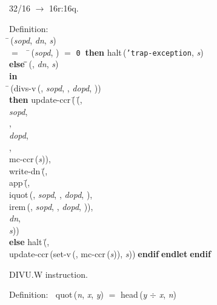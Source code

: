  32/16 $\rightarrow$ 16r:16q.
\begin{tabbing}{\sc Definition}: \\  
\=\,({\it{sopd\/}}, {\it{dn\/}}, {\it{s\/}}) \\ 
$=$$\;\;\;\;$\=\,({\it{sopd\/}}, {}) $=$ {\tt{0}}$\;\;${\bf then }{\rm{halt}}\,({\tt{'}}{\tt{trap-exception}}, {\it{s\/}}) \\ 
{\bf else }\=\=\,({}, {\it{dn\/}}, {\it{s\/}})\- \\ 
{\bf in} \\ 
\=\,({\rm{divs-v}}\,({}, {\it{sopd\/}}, {}, {\it{dopd\/}}, {})) \\ 
{\bf then }{\rm{update-ccr}}\,(\=\,(\=, \\ 
{\it{sopd\/}}, \\ 
{}, \\ 
{\it{dopd\/}}, \\ 
{}, \\ 
{\rm{mc-ccr}}\,({\it{s\/}}))\-, \\ 
{\rm{write-dn}}\,(\=, \\ 
{\rm{app}}\,(\=, \\ 
{\rm{iquot}}\,({}, {\it{sopd\/}}, {}, {\it{dopd\/}}, {}), \\ 
{\rm{irem}}\,({}, {\it{sopd\/}}, {}, {\it{dopd\/}}, {}))\-, \\ 
{\it{dn\/}}, \\ 
{\it{s\/}})\-)\- \\ 
{\bf else }{\rm{halt}}\,(\=, \\ 
{\rm{update-ccr}}\,({\rm{set-v}}\,({}, {\rm{mc-ccr}}\,({\it{s\/}})), {\it{s\/}}))\-$\;${\bf  endif}\-$\;${\bf  endlet}\-$\;${\bf  endif}\-\-
\end{tabbing}

 DIVU.W instruction.
\begin{tabbing}{\sc Definition}:$\;\;$
{\rm{quot}}\,({\it{n\/}}, {\it{x\/}}, {\it{y\/}}) $=$ {\rm{head}}\,({\it{y\/}} $\div$ {\it{x\/}}, {\it{n\/}})
\end{tabbing}

